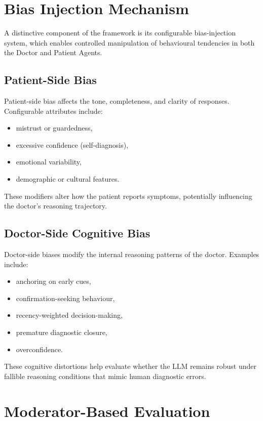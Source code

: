 \section{Bias Injection Mechanism}

A distinctive component of the framework is its configurable bias-injection system, which enables controlled manipulation of behavioural tendencies in both the Doctor and Patient Agents.

\subsection{Patient-Side Bias}

Patient-side bias affects the tone, completeness, and clarity of responses. Configurable attributes include:
\begin{itemize}
    \item mistrust or guardedness,
    \item excessive confidence (self-diagnosis),
    \item emotional variability,
    \item demographic or cultural features.
\end{itemize}

These modifiers alter how the patient reports symptoms, potentially influencing the doctor's reasoning trajectory.

\subsection{Doctor-Side Cognitive Bias}

Doctor-side biases modify the internal reasoning patterns of the doctor. Examples include:
\begin{itemize}
    \item anchoring on early cues,
    \item confirmation-seeking behaviour,
    \item recency-weighted decision-making,
    \item premature diagnostic closure,
    \item overconfidence.
\end{itemize}

These cognitive distortions help evaluate whether the LLM remains robust under fallible reasoning conditions that mimic human diagnostic errors.

\section{Moderator-Based Evaluation}

